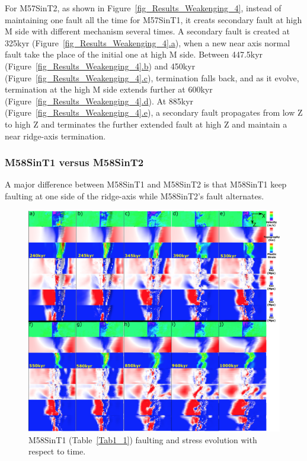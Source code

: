 For M57SinT2, as shown in Figure~\hyperref[fig_Results_Weakenging_4]{\ref{fig_Results_Weakenging_4}}, instead of maintaining one fault all the time for M57SinT1, it creats secondary fault at high M side with different mechanism several times. A secondary fault is created at 325kyr (Figure~\hyperref[fig_Results_Weakenging_4]{\ref{fig_Results_Weakenging_4}.a}), when a new near axis normal fault take the place of the initial one at high M side. Between 447.5kyr (Figure~\hyperref[fig_Results_Weakenging_4]{\ref{fig_Results_Weakenging_4}.b}) and 450kyr (Figure~\hyperref[fig_Results_Weakenging_4]{\ref{fig_Results_Weakenging_4}.c}), termination falls back, and as it evolve, termination at the high M side extends further at 600kyr (Figure~\hyperref[fig_Results_Weakenging_4]{\ref{fig_Results_Weakenging_4}.d}). At 885kyr (Figure~\hyperref[fig_Results_Weakenging_4]{\ref{fig_Results_Weakenging_4}.e}), a secondary fault propagates from low Z to high Z and terminates the further extended fault at high Z and maintain a near ridge-axis termination.

\subsubsection{M58SinT1 versus M58SinT2}

A major difference between M58SinT1 and M58SinT2 is that M58SinT1 keep faulting at one side of the ridge-axis while M58SinT2's fault alternates.

\begin{figure}[h]
 \centering
  \includegraphics[width=1.0\textwidth]{./Figures/fig_Results_Weakening_5_M58SinT1_time_evolution.eps}
 \caption{M58SinT1 (Table~\hyperref[Tab1_1]{\ref{Tab1_1}}) faulting and stress evolution with respect to time.}
\label{fig_Results_Weakenging_5}
\end{figure}

